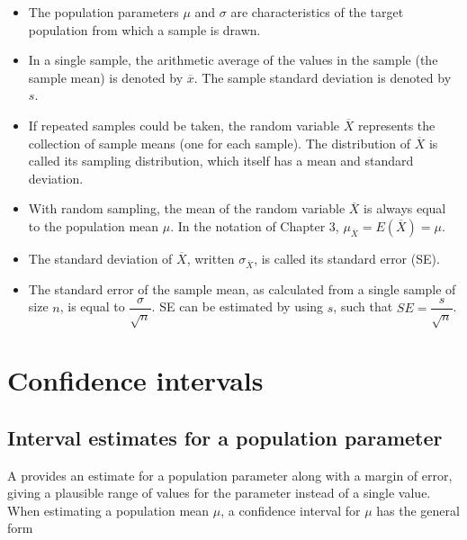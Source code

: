 \begin{spacing}{1.5}
\begin{itemize}
	
	\item The population parameters $\mu$ and $\sigma$ are characteristics of the target population from which a sample is drawn. 
	
	\item In a single sample, the arithmetic average of the values in the sample (the sample mean) is denoted by $\overline{x}$. The sample standard deviation is denoted by $s$. 
	
	\item If repeated samples could be taken, the random variable $\overline{X}$ represents the collection of sample means (one for each sample). The distribution of $\overline{X}$ is called its sampling distribution, which itself has a mean and standard deviation. 
	
	\item With random sampling, the mean of the random variable $\overline{X}$ is always equal to the population mean $\mu$.  In the notation of Chapter 3, $\mu_{\overline{X}} = E(\overline{X}) = \mu$.
	
	\item  The standard deviation of $\overline{X}$, written $\sigma_{\overline{X}}$, is called its standard error (SE). 
	
	\item The standard error of the sample mean, as calculated from a single sample of size $n$, is equal to $\dfrac{\sigma}{\sqrt{n}}$. SE can be estimated by using $s$, such that $SE = \dfrac{s}{\sqrt{n}}$.
	
\end{itemize}



\section[Confidence intervals]{Confidence intervals} %
\label{confidenceIntervals}
\subsection{Interval estimates for a population parameter}

A  provides an estimate for a population parameter along with a margin of error, giving a plausible range of values for the parameter instead of a single value. When estimating a population mean $\mu$, a confidence interval for $\mu$ has the general form


\end{spacing}
